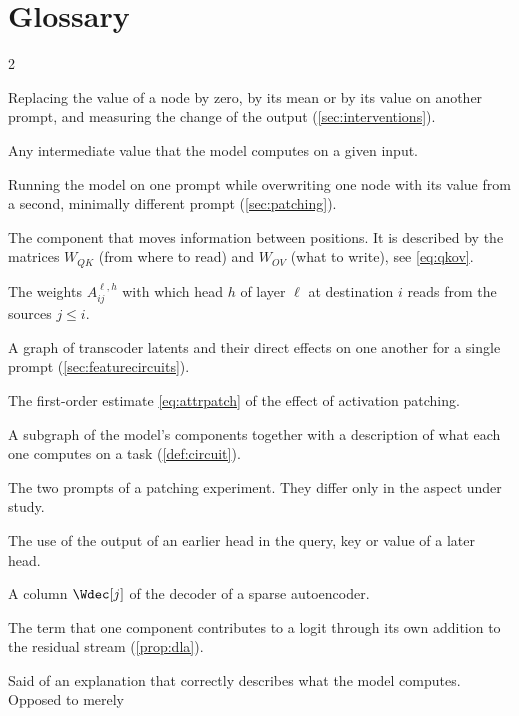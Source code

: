\section{Glossary}
\label{app:glossary}

{\small \setlength{\columnsep}{20pt}
\begin{multicols}{2}
\begin{description}[style=sameline, leftmargin=0pt, itemsep=1.5pt, font=\normalfont\bfseries]
\item[Ablation.] Replacing the value of a node by zero, by its mean or by its value on another prompt, and
measuring the change of the output (\cref{sec:interventions}).
\item[Activation.] Any intermediate value that the model computes on a given input.
\item[Activation patching.] Running the model on one prompt while overwriting one node with its value from a
second, minimally different prompt (\cref{sec:patching}).
\item[Attention head.] The component that moves information between positions. It is described by the matrices
$W_{QK}$ (from where to read) and $W_{OV}$ (what to write), see \eqref{eq:qkov}.
\item[Attention pattern.] The weights $A^{\ell,h}_{ij}$ with which head $h$ of layer $\ell$ at destination $i$
reads from the sources $j\le i$.
\item[Attribution graph.] A graph of transcoder latents and their direct effects on one another for a single
prompt (\cref{sec:featurecircuits}).
\item[Attribution patching.] The first-order estimate \eqref{eq:attrpatch} of the effect of activation patching.
\item[Circuit.] A subgraph of the model's components together with a description of what each one computes on
a task (\cref{def:circuit}).
\item[Clean and corrupted prompt.] The two prompts of a patching experiment. They differ only in the aspect
under study.
\item[Composition.] The use of the output of an earlier head in the query, key or value of a later head.
\item[Dictionary direction.] A column $\Wdec[j]$ of the decoder of a sparse autoencoder.
\item[Direct logit attribution.] The term that one component contributes to a logit through its own addition
to the residual stream (\cref{prop:dla}).
\item[Faithful.] Said of an explanation that correctly describes what the model computes. Opposed to merely

\end{description}
\end{multicols}}
